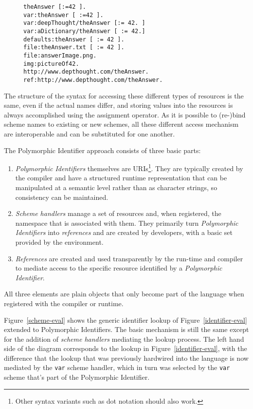 \documentclass[preprint,authoryear]{llncs}
\begin{document}
\begin{figure}[htbp]
\begin{lstlisting}[style=numbers,label=polymorphic-identifier-examples,caption=Some variants of Polymorphic Identifiers.]
theAnswer [:=42 ].
var:theAnswer [ :=42 ].
var:deepThought/theAnswer [:= 42. ]
var:aDictionary/theAnswer [ := 42.]
defaults:theAnswer [ := 42 ].
file:theAnswer.txt [ := 42 ].
file:answerImage.png.
img:pictureOf42.
http://www.depthought.com/theAnswer.
ref:http://www.depthought.com/theAnswer.
\end{lstlisting}
\end{figure}

The structure of the syntax for accessing these different types of resources is the same, even if the actual
names differ, and storing values into the resources is always accomplished using the assignment operator.
As it is possible to (re-)bind scheme names to existing or new schemes, all these different access 
mechanism are interoperable and can be substituted for one another.

The Polymorphic Identifier approach consists of three basic parts:
\begin{enumerate}
\item \emph{Polymorphic Identifiers} themselves are URIs\footnote{Other syntax variants such as dot notation should also work.}.
	  They are typically created by the 
	compiler and have a structured runtime representation that can be manipulated
	at a semantic level rather than as character strings, so consistency can be 
	maintained.
\item \emph{Scheme handlers} manage a set of resources and, when registered,
	 the namespace that is associated
	with them.  They primarily turn \emph{Polymorphic Identifiers} into \emph{references} and
	are created by developers, with a basic set provided by the environment.
\item \emph{References} are created and used transparently by the run-time and compiler
	to mediate access to the specific resource identified by a \emph{Polymorphic Identifier}.
	
	
\end{enumerate}

All three elements are plain objects that only become part of the language when registered
with the compiler or runtime.

Figure~\ref{scheme-eval} shows the generic identifier lookup of Figure~\ref{identifier-eval}
extended to Polymorphic Identifiers.  The basic mechanism is still the same except for the
addition of \emph{scheme handlers} mediating the lookup process.  The left hand side of the
diagram corresponds to the lookup in Figure~\ref{identifier-eval}, with the difference that
the lookup that was previously hardwired into the language is now mediated by the {\tt var}
scheme handler, which in turn was selected by the {\tt var} scheme that's part of the 
Polymorphic Identifier.
\end{document}
